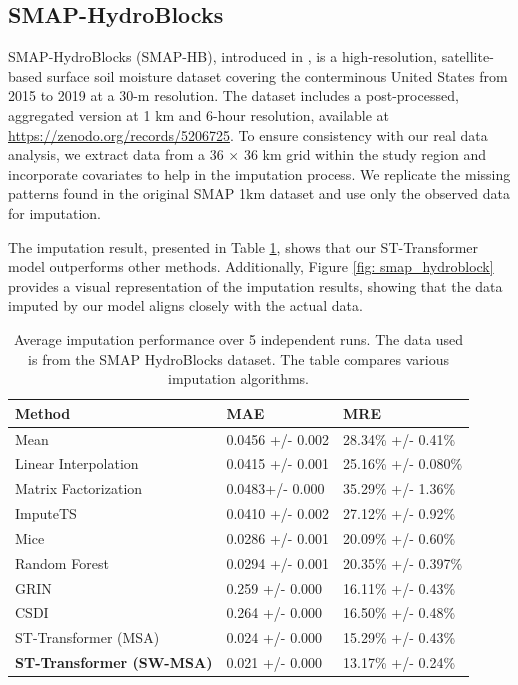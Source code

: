\documentclass[11pt]{article}
\begin{document}
\subsection{SMAP-HydroBlocks}
SMAP-HydroBlocks (SMAP-HB), introduced in \citet{vergopolan2021smap}, is a high-resolution, satellite-based surface soil moisture dataset covering the conterminous United States from 2015 to 2019 at a 30-m resolution. The dataset includes a post-processed, aggregated version at 1 km and 6-hour resolution, available at \href{https://zenodo.org/records/5206725}{https://zenodo.org/records/5206725}. To ensure consistency with our real data analysis, we extract data from a 36 $\times$ 36 km grid within the study region and incorporate covariates to help in the imputation process. We replicate the missing patterns found in the original SMAP 1km dataset and use only the observed data for imputation. 

The imputation result, presented in Table \ref{tab: smap_hydroblock}, shows that our ST-Transformer model outperforms other methods. Additionally, Figure \ref{fig: smap_hydroblock} provides a visual representation of the imputation results, showing that the data imputed by our model aligns closely with the actual data. 
\begin{table}
    \centering
    \begin{tabularx}{\textwidth}{lXX}
        \toprule
       Method & MAE & MRE \\
        \midrule
        Mean & 0.0456 +/- 0.002& 28.34\% +/- 0.41\%  \\
        Linear Interpolation & 0.0415 +/- 0.001 & 25.16\% +/- 0.080\%\\
        Matrix Factorization & 0.0483+/- 0.000 & 35.29\% +/- 1.36\% \\
        ImputeTS & 0.0410 +/- 0.002 & 27.12\% +/- 0.92\% \\
        Mice & 0.0286 +/- 0.001& 20.09\% +/- 0.60\% \\
        Random Forest &  0.0294 +/- 0.001&  20.35\% +/- 0.397\%\\
   		GRIN &0.259 +/- 0.000 & 16.11\% +/- 0.43\%\\
        CSDI & 0.264 +/- 0.000 & 16.50\% +/- 0.48\%\\
        ST-Transformer (MSA) & 0.024 +/- 0.000 & 15.29\% +/- 0.43\%\\
        \textbf{ST-Transformer (SW-MSA)} & 0.021 +/- 0.000 & 13.17\% +/- 0.24\%\\
        
        \bottomrule

        
    \end{tabularx}
    \caption{Average imputation performance over 5 independent runs. The data used is from the SMAP HydroBlocks dataset. The table compares various imputation algorithms.}
    \label{tab: smap_hydroblock}
\end{table}
\end{document}
